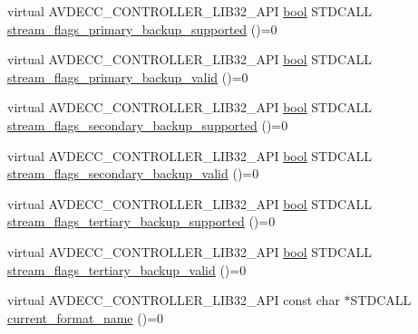 \begin{DoxyCompactItemize}
\item 
virtual A\+V\+D\+E\+C\+C\+\_\+\+C\+O\+N\+T\+R\+O\+L\+L\+E\+R\+\_\+\+L\+I\+B32\+\_\+\+A\+PI \hyperlink{avb__gptp_8h_af6a258d8f3ee5206d682d799316314b1}{bool} S\+T\+D\+C\+A\+LL \hyperlink{classavdecc__lib_1_1stream__input__descriptor__response_aea1a6dbe70cfe299a12bcb2a4ea73a38}{stream\+\_\+flags\+\_\+primary\+\_\+backup\+\_\+supported} ()=0
\item 
virtual A\+V\+D\+E\+C\+C\+\_\+\+C\+O\+N\+T\+R\+O\+L\+L\+E\+R\+\_\+\+L\+I\+B32\+\_\+\+A\+PI \hyperlink{avb__gptp_8h_af6a258d8f3ee5206d682d799316314b1}{bool} S\+T\+D\+C\+A\+LL \hyperlink{classavdecc__lib_1_1stream__input__descriptor__response_a35e1c2d08ac6d699e575f3ba118ef0f7}{stream\+\_\+flags\+\_\+primary\+\_\+backup\+\_\+valid} ()=0
\item 
virtual A\+V\+D\+E\+C\+C\+\_\+\+C\+O\+N\+T\+R\+O\+L\+L\+E\+R\+\_\+\+L\+I\+B32\+\_\+\+A\+PI \hyperlink{avb__gptp_8h_af6a258d8f3ee5206d682d799316314b1}{bool} S\+T\+D\+C\+A\+LL \hyperlink{classavdecc__lib_1_1stream__input__descriptor__response_acb3e666eaff1f1303ba9c2733aee3d52}{stream\+\_\+flags\+\_\+secondary\+\_\+backup\+\_\+supported} ()=0
\item 
virtual A\+V\+D\+E\+C\+C\+\_\+\+C\+O\+N\+T\+R\+O\+L\+L\+E\+R\+\_\+\+L\+I\+B32\+\_\+\+A\+PI \hyperlink{avb__gptp_8h_af6a258d8f3ee5206d682d799316314b1}{bool} S\+T\+D\+C\+A\+LL \hyperlink{classavdecc__lib_1_1stream__input__descriptor__response_a83765255f81d93d3bb28eeb9edec8904}{stream\+\_\+flags\+\_\+secondary\+\_\+backup\+\_\+valid} ()=0
\item 
virtual A\+V\+D\+E\+C\+C\+\_\+\+C\+O\+N\+T\+R\+O\+L\+L\+E\+R\+\_\+\+L\+I\+B32\+\_\+\+A\+PI \hyperlink{avb__gptp_8h_af6a258d8f3ee5206d682d799316314b1}{bool} S\+T\+D\+C\+A\+LL \hyperlink{classavdecc__lib_1_1stream__input__descriptor__response_abbd3928cc72f811f32fcb5a079f791b2}{stream\+\_\+flags\+\_\+tertiary\+\_\+backup\+\_\+supported} ()=0
\item 
virtual A\+V\+D\+E\+C\+C\+\_\+\+C\+O\+N\+T\+R\+O\+L\+L\+E\+R\+\_\+\+L\+I\+B32\+\_\+\+A\+PI \hyperlink{avb__gptp_8h_af6a258d8f3ee5206d682d799316314b1}{bool} S\+T\+D\+C\+A\+LL \hyperlink{classavdecc__lib_1_1stream__input__descriptor__response_a430a18cf3301728015f75d8a80676004}{stream\+\_\+flags\+\_\+tertiary\+\_\+backup\+\_\+valid} ()=0
\item 
virtual A\+V\+D\+E\+C\+C\+\_\+\+C\+O\+N\+T\+R\+O\+L\+L\+E\+R\+\_\+\+L\+I\+B32\+\_\+\+A\+PI const char $\ast$S\+T\+D\+C\+A\+LL \hyperlink{classavdecc__lib_1_1stream__input__descriptor__response_a24176b56bc0f1873b27d00565bc397c5}{current\+\_\+format\+\_\+name} ()=0

\end{DoxyCompactItemize}
